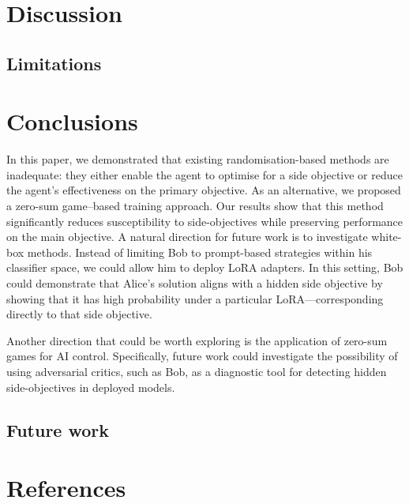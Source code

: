 \documentclass{article}
\begin{document}
\section{Discussion}

\subsection{Limitations}



\section{Conclusions}

In this paper, we demonstrated that existing randomisation-based methods are inadequate: they either enable the agent to optimise for a side objective or reduce the agent’s effectiveness on the primary objective. As an alternative, we proposed a zero-sum game–based training approach. Our results show that this method significantly reduces susceptibility to side-objectives while preserving performance on the main objective.
A natural direction for future work is to investigate white-box methods. Instead of limiting Bob to prompt-based strategies within his classifier space, we could allow him to deploy LoRA adapters. In this setting, Bob could demonstrate that Alice’s solution aligns with a hidden side objective by showing that it has high probability under a particular LoRA—corresponding directly to that side objective.

Another direction that could be worth exploring is the application of zero-sum games for AI control. Specifically, future work could investigate the possibility of using adversarial critics, such as Bob, as a diagnostic tool for detecting hidden side-objectives in deployed models.


\subsection{Future work}

\section{References}





\appendix
\end{document}
